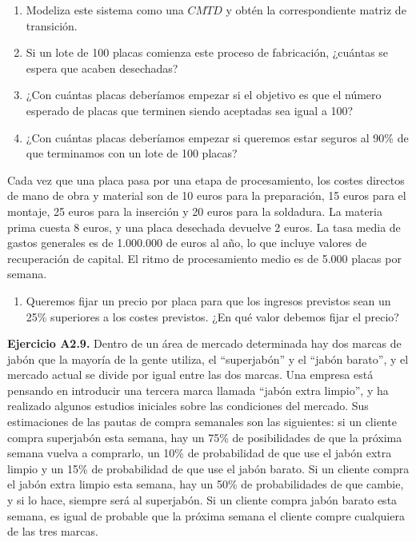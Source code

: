 \documentclass[
]{book}
\providecommand{\tightlist}{%
  \setlength{\itemsep}{0pt}\setlength{\parskip}{0pt}}
\theoremstyle{definition}
\theoremstyle{definition}
\theoremstyle{definition}
\theoremstyle{definition}
\theoremstyle{remark}
\begin{document}
\begin{enumerate}
\def\labelenumi{\arabic{enumi}.}
\tightlist
\item
  Modeliza este sistema como una \(CMTD\) y obtén la correspondiente matriz de transición.
\item
  Si un lote de 100 placas comienza este proceso de fabricación, ¿cuántas se espera que acaben desechadas?
\item
  ¿Con cuántas placas deberíamos empezar si el objetivo es que el número esperado de placas que terminen siendo aceptadas sea igual a 100?
\item
  ¿Con cuántas placas deberíamos empezar si queremos estar seguros al 90\% de que terminamos con un lote de 100 placas?
\end{enumerate}

Cada vez que una placa pasa por una etapa de procesamiento, los costes directos de mano de obra y material son de 10 euros para la preparación, 15 euros para el montaje, 25 euros para la inserción y 20 euros para la soldadura. La materia prima cuesta 8 euros, y una placa desechada devuelve 2 euros. La tasa media de gastos generales es de 1.000.000 de euros al año, lo que incluye valores de recuperación de capital. El ritmo de procesamiento medio es de 5.000 placas por semana.

\begin{enumerate}
\def\labelenumi{\arabic{enumi}.}
\setcounter{enumi}{4}
\tightlist
\item
  Queremos fijar un precio por placa para que los ingresos previstos sean un 25\% superiores a los costes previstos. ¿En qué valor debemos fijar el precio?
\end{enumerate}

\textbf{Ejercicio A2.9.} Dentro de un área de mercado determinada hay dos marcas de jabón que la mayoría de la gente utiliza, el ``superjabón'' y el ``jabón barato'', y el mercado actual se divide por igual entre las dos marcas. Una empresa está pensando en introducir una tercera marca llamada ``jabón extra limpio'', y ha realizado algunos estudios iniciales sobre las condiciones del mercado. Sus estimaciones de las pautas de compra semanales son las siguientes: si un cliente compra superjabón esta semana, hay un 75\% de posibilidades de que la próxima semana vuelva a comprarlo, un 10\% de probabilidad de que use el jabón extra limpio y un 15\% de probabilidad de que use el jabón barato. Si un cliente compra el jabón extra limpio esta semana, hay un 50\% de probabilidades de que cambie, y si lo hace, siempre será al superjabón. Si un cliente compra jabón barato esta semana, es igual de probable que la próxima semana el cliente compre cualquiera de las tres marcas.
\end{document}

